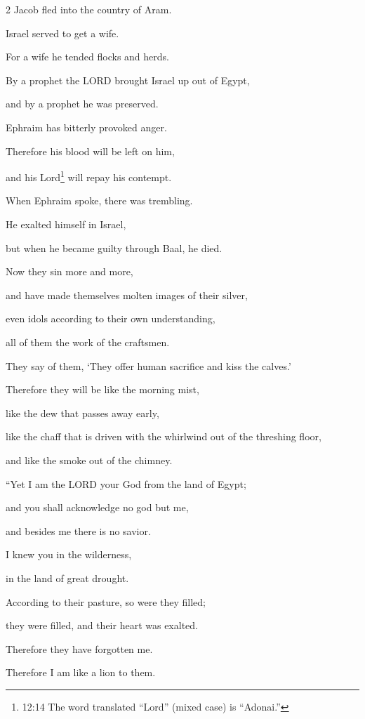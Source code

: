 \begin{multicols}{2}
\myverse{}Jacob fled into the country of Aram.

Israel served to get a wife.

For a wife he tended flocks and herds.

\myverse{}By a prophet the LORD brought Israel up out of Egypt,

and by a prophet he was preserved.

\myverse{}Ephraim has bitterly provoked anger.

Therefore his blood will be left on him,

and his Lord\footnote{12:14 The word translated “Lord” (mixed case) is “Adonai.”} will repay his contempt.


\mychapter{} \myverse*{}When Ephraim spoke, there was trembling.

\quad\quad He exalted himself in Israel,

but when he became guilty through Baal, he died.

\myverse{}Now they sin more and more,

and have made themselves molten images of their silver,

even idols according to their own understanding,

all of them the work of the craftsmen.

They say of them, ‘They offer human sacrifice and kiss the calves.’

\myverse{}Therefore they will be like the morning mist,

like the dew that passes away early,

like the chaff that is driven with the whirlwind out of the threshing floor,

and like the smoke out of the chimney.


\vspace{\baselineskip} \myverse{}“Yet I am the LORD your God from the land of Egypt;

and you shall acknowledge no god but me,

and besides me there is no savior.

\myverse{}I knew you in the wilderness,

in the land of great drought.

\myverse{}According to their pasture, so were they filled;

they were filled, and their heart was exalted.

Therefore they have forgotten me.

\myverse{}Therefore I am like a lion to them.


\end{multicols}
